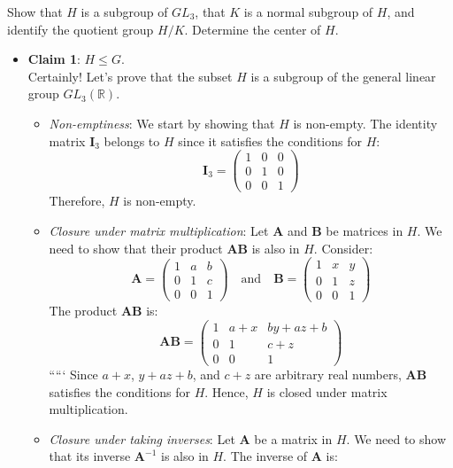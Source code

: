 \documentclass[
]{book}
\begin{document}
Show that \(H\) is a subgroup of \(GL_3\), that \(K\) is a normal
subgroup of \(H\), and identify the quotient group \(H/K\). Determine
the center of \(H\).

\begin{itemize}
\item
  \textbf{Claim 1}: \(H \leq G\).\\
  Certainly! Let's prove that the subset \(H\) is a subgroup of the
  general linear group \(GL_3(\mathbb{R})\).

  \begin{itemize}
  \item
    \emph{Non-emptiness}: We start by showing that \(H\) is non-empty.
    The identity matrix \(\mathbf{I}_3\) belongs to \(H\) since it
    satisfies the conditions for \(H\):
    \[ \mathbf{I}_3 = \begin{pmatrix} 1 & 0 & 0 \\ 0 & 1 & 0 \\ 0 & 0 & 1 \end{pmatrix} \]
    Therefore, \(H\) is non-empty.
  \item
    \emph{Closure under matrix multiplication}: Let \(\mathbf{A}\) and
    \(\mathbf{B}\) be matrices in \(H\). We need to show that their
    product \(\mathbf{AB}\) is also in \(H\). Consider:
    \[ \mathbf{A} = \begin{pmatrix} 1 & a & b \\ 0 & 1 & c \\ 0 & 0 & 1 \end{pmatrix} \quad \text{and} \quad \mathbf{B} = \begin{pmatrix} 1 & x & y \\ 0 & 1 & z \\ 0 & 0 & 1 \end{pmatrix} \]
    The product \(\mathbf{AB}\) is:
    \[ \mathbf{AB} = \begin{pmatrix} 1 & a+x & by+az+b \\ 0 & 1 & c+z \\ 0 & 0 & 1 \end{pmatrix} \]
    ````` Since \(a+x\), \(y+az+b\), and \(c+z\) are arbitrary real
    numbers, \(\mathbf{AB}\) satisfies the conditions for \(H\). Hence,
    \(H\) is closed under matrix multiplication.
  \item
    \emph{Closure under taking inverses}: Let \(\mathbf{A}\) be a matrix
    in \(H\). We need to show that its inverse \(\mathbf{A}^{-1}\) is
    also in \(H\). The inverse of \(\mathbf{A}\) is:
  \end{itemize}
\end{itemize}
\end{document}
